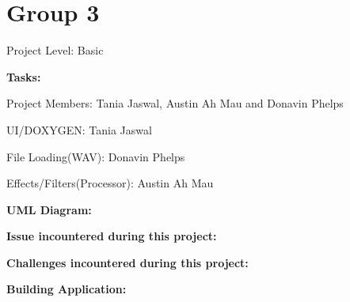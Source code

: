 \section*{Group 3}

Project Level\+: Basic

{\bfseries Tasks\+:}

Project Members\+: Tania Jaswal, Austin Ah Mau and Donavin Phelps

U\+I/\+D\+O\+X\+Y\+G\+EN\+: Tania Jaswal

File Loading(\+W\+A\+V)\+: Donavin Phelps

Effects/\+Filters(Processor)\+: Austin Ah Mau

{\bfseries U\+ML Diagram\+:}

{\bfseries Issue incountered during this project\+:}

{\bfseries Challenges incountered during this project\+:}

{\bfseries Building Application\+:} 